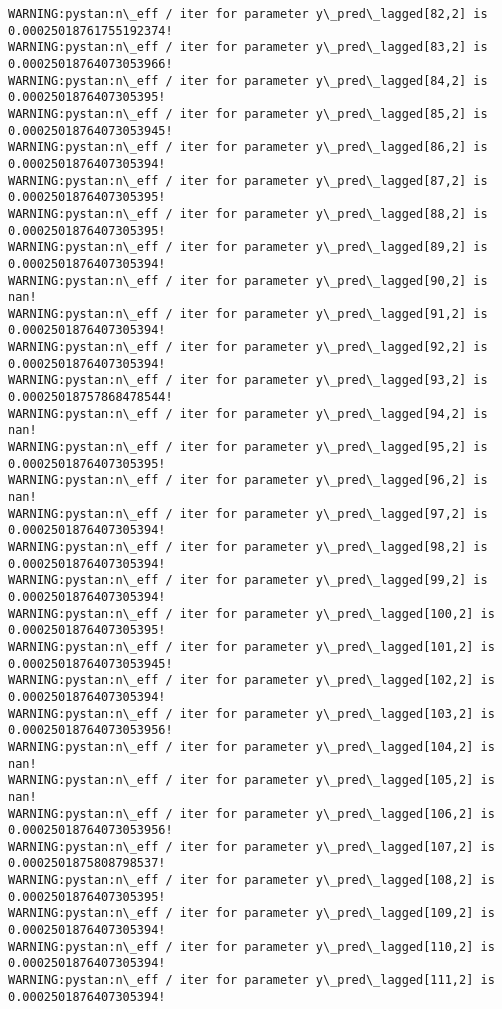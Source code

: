 \documentclass[11pt]{article}
\begin{document}
\begin{Verbatim}[commandchars=\\\{\}]
WARNING:pystan:n\_eff / iter for parameter y\_pred\_lagged[82,2] is 0.00025018761755192374!
WARNING:pystan:n\_eff / iter for parameter y\_pred\_lagged[83,2] is 0.00025018764073053966!
WARNING:pystan:n\_eff / iter for parameter y\_pred\_lagged[84,2] is 0.0002501876407305395!
WARNING:pystan:n\_eff / iter for parameter y\_pred\_lagged[85,2] is 0.00025018764073053945!
WARNING:pystan:n\_eff / iter for parameter y\_pred\_lagged[86,2] is 0.0002501876407305394!
WARNING:pystan:n\_eff / iter for parameter y\_pred\_lagged[87,2] is 0.0002501876407305395!
WARNING:pystan:n\_eff / iter for parameter y\_pred\_lagged[88,2] is 0.0002501876407305395!
WARNING:pystan:n\_eff / iter for parameter y\_pred\_lagged[89,2] is 0.0002501876407305394!
WARNING:pystan:n\_eff / iter for parameter y\_pred\_lagged[90,2] is nan!
WARNING:pystan:n\_eff / iter for parameter y\_pred\_lagged[91,2] is 0.0002501876407305394!
WARNING:pystan:n\_eff / iter for parameter y\_pred\_lagged[92,2] is 0.0002501876407305394!
WARNING:pystan:n\_eff / iter for parameter y\_pred\_lagged[93,2] is 0.00025018757868478544!
WARNING:pystan:n\_eff / iter for parameter y\_pred\_lagged[94,2] is nan!
WARNING:pystan:n\_eff / iter for parameter y\_pred\_lagged[95,2] is 0.0002501876407305395!
WARNING:pystan:n\_eff / iter for parameter y\_pred\_lagged[96,2] is nan!
WARNING:pystan:n\_eff / iter for parameter y\_pred\_lagged[97,2] is 0.0002501876407305394!
WARNING:pystan:n\_eff / iter for parameter y\_pred\_lagged[98,2] is 0.0002501876407305394!
WARNING:pystan:n\_eff / iter for parameter y\_pred\_lagged[99,2] is 0.0002501876407305394!
WARNING:pystan:n\_eff / iter for parameter y\_pred\_lagged[100,2] is 0.0002501876407305395!
WARNING:pystan:n\_eff / iter for parameter y\_pred\_lagged[101,2] is 0.00025018764073053945!
WARNING:pystan:n\_eff / iter for parameter y\_pred\_lagged[102,2] is 0.0002501876407305394!
WARNING:pystan:n\_eff / iter for parameter y\_pred\_lagged[103,2] is 0.00025018764073053956!
WARNING:pystan:n\_eff / iter for parameter y\_pred\_lagged[104,2] is nan!
WARNING:pystan:n\_eff / iter for parameter y\_pred\_lagged[105,2] is nan!
WARNING:pystan:n\_eff / iter for parameter y\_pred\_lagged[106,2] is 0.00025018764073053956!
WARNING:pystan:n\_eff / iter for parameter y\_pred\_lagged[107,2] is 0.0002501875808798537!
WARNING:pystan:n\_eff / iter for parameter y\_pred\_lagged[108,2] is 0.0002501876407305395!
WARNING:pystan:n\_eff / iter for parameter y\_pred\_lagged[109,2] is 0.0002501876407305394!
WARNING:pystan:n\_eff / iter for parameter y\_pred\_lagged[110,2] is 0.0002501876407305394!
WARNING:pystan:n\_eff / iter for parameter y\_pred\_lagged[111,2] is 0.0002501876407305394!

\end{Verbatim}
\end{document}
